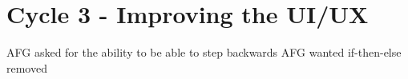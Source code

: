 \chapter{Cycle 3 - Improving the UI/UX}
AFG asked for the ability to be able to step backwards
AFG wanted if-then-else removed
